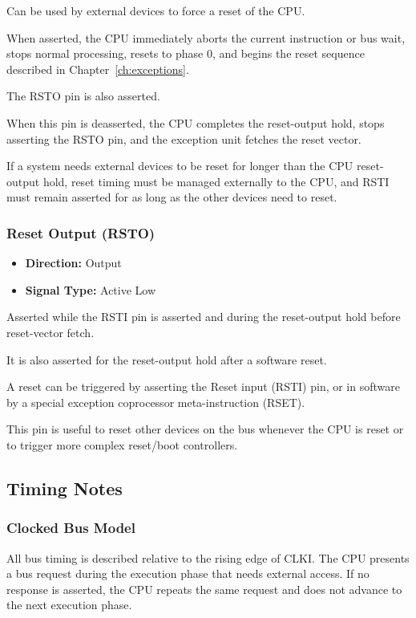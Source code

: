 Can be used by external devices to force a reset of the CPU.

When asserted, the CPU immediately aborts the current instruction or bus wait, stops normal processing, resets to phase
0, and begins the reset sequence described in Chapter~\ref{ch:exceptions}.

The RSTO pin is also asserted.

When this pin is deasserted, the CPU completes the reset-output hold, stops asserting the RSTO pin, and the exception
unit fetches the reset vector.

If a system needs external devices to be reset for longer than the CPU reset-output hold, reset timing must be managed
externally to the CPU, and RSTI must remain asserted for as long as the other devices need to reset.

\subsubsection{Reset Output (RSTO)}

\begin{itemize}
	\item \textbf{Direction:} Output
	\item \textbf{Signal Type:} Active Low
\end{itemize}

Asserted while the RSTI pin is asserted and during the reset-output hold before reset-vector fetch.

It is also asserted for the reset-output hold after a software reset.

A reset can be triggered by asserting the Reset input (RSTI) pin, or in software by a special exception coprocessor
meta-instruction (RSET).

This pin is useful to reset other devices on the bus whenever the CPU is reset or to trigger more complex reset/boot
controllers.

\subsection{Timing Notes}

\subsubsection{Clocked Bus Model}

All bus timing is described relative to the rising edge of CLKI. The CPU presents a bus request during the execution
phase that needs external access. If no response is asserted, the CPU repeats the same request and does not advance to
the next execution phase.

